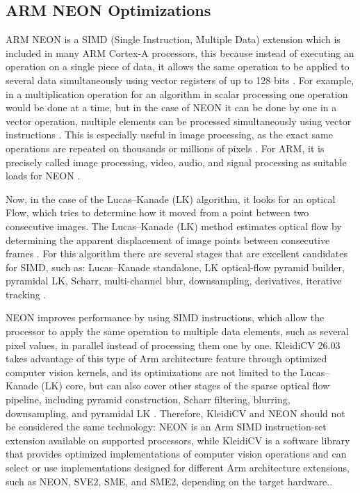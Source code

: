 \documentclass[conference]{IEEEtran}
\begin{document}
\subsection{ARM NEON Optimizations}

ARM NEON is a SIMD (Single Instruction, Multiple Data) extension which is included in many ARM Cortex-A processors, this because instead of executing an operation on a single piece of data, it allows the same operation to be applied to several data simultaneously using vector registers of up to 128 bits \cite{ref39}. For example, in a multiplication operation for an algorithm in scalar processing one operation would be done at a time, but in the case of NEON it can be done by one in a vector operation, multiple elements can be processed simultaneously using vector instructions \cite{ref31}. This is especially useful in image processing, as the exact same operations are repeated on thousands or millions of pixels \cite{ref31,ref39}. For ARM, it is precisely called image processing, video, audio, and signal processing as suitable loads for NEON \cite{ref39}.

Now, in the case of the Lucas–Kanade (LK) algorithm, it looks for an optical Flow, which tries to determine how it moved from a point between two consecutive images. The Lucas–Kanade (LK) method estimates optical flow by determining the apparent displacement of image points between consecutive frames \cite{ref40}. For this algorithm there are several stages that are excellent candidates for SIMD, such as: Lucas–Kanade standalone, LK optical-flow pyramid builder, pyramidal LK, Scharr, multi-channel blur, downsampling, derivatives, iterative tracking \cite{ref5}.

NEON improves performance by using SIMD instructions, which allow the processor to apply the same operation to multiple data elements, such as several pixel values, in parallel instead of processing them one by one. KleidiCV 26.03 takes advantage of this type of Arm architecture feature through optimized computer vision kernels, and its optimizations are not limited to the Lucas–Kanade (LK) core, but can also cover other stages of the sparse optical flow pipeline, including pyramid construction, Scharr filtering, blurring, downsampling, and pyramidal LK \cite{ref5}. Therefore, KleidiCV and NEON should not be considered the same technology: NEON is an Arm SIMD instruction-set extension available on supported processors, while KleidiCV is a software library that provides optimized implementations of computer vision operations and can select or use implementations designed for different Arm architecture extensions, such as NEON, SVE2, SME, and SME2, depending on the target hardware.\cite{ref5}.
\end{document}
